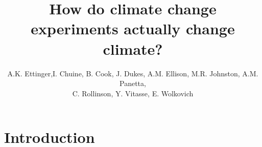 \documentclass{article}
\begin{document}
 
\title{How do climate change experiments actually change climate?} %

\author{A.K. Ettinger,I. Chuine, B. Cook, J. Dukes, A.M. Ellison, M.R. Johnston, A.M. Panetta,\\ C. Rollinson, Y. Vitasse, E. Wolkovich}
\maketitle  %


\section* {Introduction}
\end{document}
